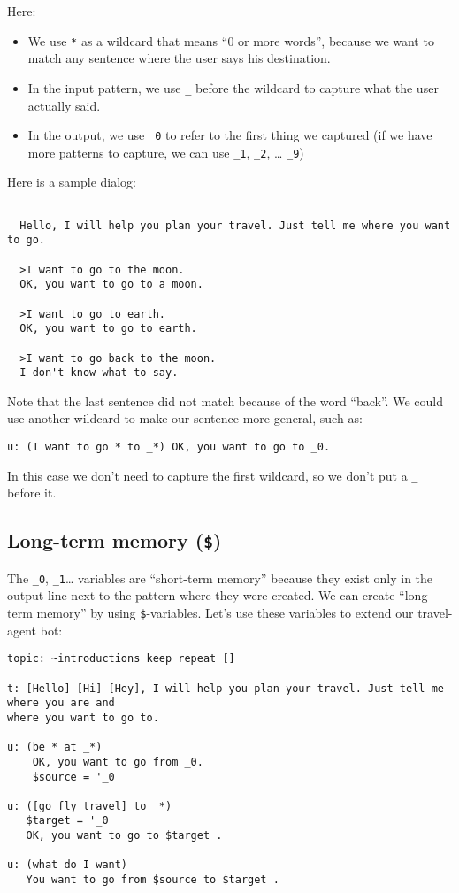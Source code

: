 \documentclass[]{article}
\providecommand{\tightlist}{%
  \setlength{\itemsep}{0pt}\setlength{\parskip}{0pt}}
\begin{document}
Here:

\begin{itemize}
\tightlist
\item
  We use \texttt{*} as a wildcard that means ``0 or more words'',
  because we want to match any sentence where the user says his
  destination.
\item
  In the input pattern, we use \texttt{\_} before the wildcard to
  capture what the user actually said.
\item
  In the output, we use \texttt{\_0} to refer to the first thing we
  captured (if we have more patterns to capture, we can use
  \texttt{\_1}, \texttt{\_2}, \ldots{} \texttt{\_9})
\end{itemize}

Here is a sample dialog:

\begin{verbatim}

  Hello, I will help you plan your travel. Just tell me where you want to go.

  >I want to go to the moon.
  OK, you want to go to a moon.

  >I want to go to earth.
  OK, you want to go to earth.

  >I want to go back to the moon.
  I don't know what to say.
\end{verbatim}

Note that the last sentence did not match because of the word ``back''.
We could use another wildcard to make our sentence more general, such
as:

\begin{verbatim}
u: (I want to go * to _*) OK, you want to go to _0.
\end{verbatim}

In this case we don't need to capture the first wildcard, so we don't
put a \texttt{\_} before it.

\subsection{\texorpdfstring{Long-term memory
(\texttt{\$})}{Long-term memory (\$)}}\label{long-term-memory}

The \texttt{\_0}, \texttt{\_1}\ldots{} variables are ``short-term
memory'' because they exist only in the output line next to the pattern
where they were created. We can create ``long-term memory'' by using
\texttt{\$}-variables. Let's use these variables to extend our
travel-agent bot:

\begin{verbatim}
topic: ~introductions keep repeat []

t: [Hello] [Hi] [Hey], I will help you plan your travel. Just tell me where you are and
where you want to go to.

u: (be * at _*)
    OK, you want to go from _0.
    $source = '_0

u: ([go fly travel] to _*)
   $target = '_0
   OK, you want to go to $target .

u: (what do I want)
   You want to go from $source to $target .
\end{verbatim}
\end{document}
